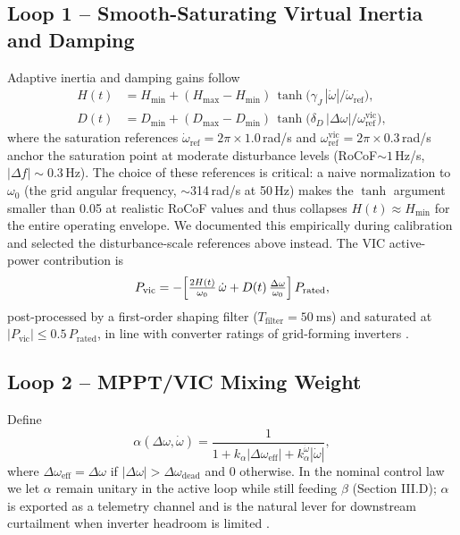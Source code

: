 \documentclass[journal]{IEEEtran}
\begin{document}
\subsection{Loop 1 -- Smooth-Saturating Virtual Inertia and Damping}
Adaptive inertia and damping gains follow
\begin{align}
H(t)&=H_\mathrm{min}+(H_\mathrm{max}-H_\mathrm{min})\,
       \tanh\!\bigl(\gamma_J\,|\dot\omega|/\dot\omega_\mathrm{ref}\bigr),
\label{eq:Ht}\\
D(t)&=D_\mathrm{min}+(D_\mathrm{max}-D_\mathrm{min})\,
       \tanh\!\bigl(\delta_D\,|\Delta\omega|/\omega_\mathrm{ref}^\mathrm{vic}\bigr),
\label{eq:Dt}
\end{align}
where the saturation references $\dot\omega_\mathrm{ref}=2\pi\times
1.0\,$rad/s and $\omega_\mathrm{ref}^\mathrm{vic}=2\pi\times 0.3\,$rad/s
anchor the saturation point at moderate disturbance levels (RoCoF$\sim
1\,$Hz/s, $|\Delta f|\sim 0.3\,$Hz). The choice of these references is
critical: a naive normalization to $\omega_0$ (the grid angular
frequency, $\sim$314\,rad/s at 50\,Hz) makes the $\tanh$ argument
smaller than 0.05 at realistic RoCoF values and thus collapses
$H(t)\approx H_\mathrm{min}$ for the entire operating envelope. We
documented this empirically during calibration and selected the
disturbance-scale references above instead. The VIC active-power contribution is
\begin{equation}
P_\mathrm{vic}=
-\Bigl[\tfrac{2H(t)}{\omega_0}\,\dot\omega+
       D(t)\,\tfrac{\Delta\omega}{\omega_0}\Bigr]\,P_\mathrm{rated},
\label{eq:Pvic}
\end{equation}
post-processed by a first-order shaping filter
($T_\mathrm{filter}=\SI{50}{\milli\second}$) and saturated at
$|P_\mathrm{vic}|\leq 0.5\,P_\mathrm{rated}$, in line with converter
ratings of grid-forming inverters \cite{khan2024gridforming,shi2025comparative}.

\subsection{Loop 2 -- MPPT/VIC Mixing Weight}
Define
\begin{equation}
\alpha(\Delta\omega,\dot\omega)=
\frac{1}{1+k_\alpha|\Delta\omega_\mathrm{eff}|+
         k_\alpha^{\dot\omega}|\dot\omega|},
\label{eq:alpha}
\end{equation}
where $\Delta\omega_\mathrm{eff}=\Delta\omega$ if
$|\Delta\omega|>\Delta\omega_\mathrm{dead}$ and $0$ otherwise. In the
nominal control law we let $\alpha$ remain unitary in the active loop
while still feeding $\beta$ (Section III.D); $\alpha$ is exported as
a telemetry channel and is the natural lever for downstream curtailment
when inverter headroom is limited \cite{zhang2025twolayer}.
\end{document}
